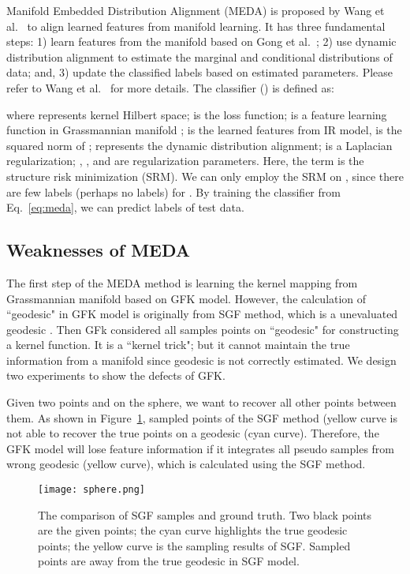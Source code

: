 \documentclass[10pt, conference, compsocconf]{IEEEtran}
\begin{document}
Manifold Embedded Distribution Alignment (MEDA) is proposed by Wang et al.~\cite{wang2018visual} to align learned features from manifold learning. 
It has three fundamental steps: 1) learn features from the manifold based on Gong et al.~\cite{gong2012geodesic}; 2) use dynamic distribution alignment to estimate the marginal and conditional distributions of data; and, 3) update the classified labels based on estimated parameters.
Please refer to Wang et al.~\cite{wang2018visual} for more details. The classifier () is defined as:


where  represents kernel Hilbert space;  is the loss function;  is a feature learning function in Grassmannian manifold \cite{gong2012geodesic};  is the learned features from IR model,  is the squared norm of ;   represents the dynamic distribution alignment;  is a Laplacian regularization; , , and  are regularization parameters. Here, the term  is the structure risk minimization (SRM). We can only employ the SRM on , since there are few labels (perhaps no labels) for .
By training the classifier from Eq.~\ref{eq:meda}, we can predict labels of test data.  

\subsection{Weaknesses of MEDA}
The first step of the MEDA method is learning the kernel mapping  from Grassmannian manifold based on GFK model. However, the calculation of ``geodesic" in GFK model is originally from SGF method, which is a unevaluated geodesic \cite{gopalan2011domain}. Then GFk considered all samples points on ``geodesic" for constructing a kernel function. It is a ``kernel trick"; but it cannot maintain the true information from a manifold since geodesic is not correctly estimated. We design two experiments to show the defects of GFK.

Given two points  and  on the sphere, we want to recover all other points between them. As shown in Figure~\ref{fig:sphere}, sampled points of the SGF method (yellow curve is not able to recover the true points on a geodesic (cyan curve). Therefore, the GFK model will lose feature information if it integrates all pseudo samples from wrong geodesic (yellow curve), which is calculated using the SGF method.   

\begin{figure}[h]
\centering
\texttt{[image: sphere.png]}
\caption{The comparison of SGF samples and ground truth. Two black points are the given points; the cyan curve highlights the true geodesic points; the yellow curve is the sampling results of SGF. Sampled points are away from the true geodesic in SGF model. }
\label{fig:sphere}
\end{figure}
\end{document}
